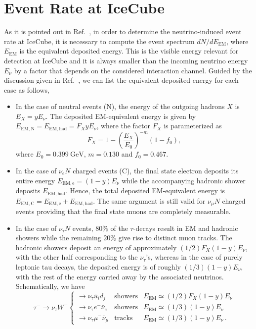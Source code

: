 \documentclass[aps,preprint,tightenlines,floatfix,superscriptaddress,nofootinbib,showpacs]{revtex4-1}
\def\beq{\begin{equation}}
\def\eeq{\end{equation}}
\begin{document}
\section{Event Rate at IceCube}
As it is pointed out in Ref.~\cite{Soni}, in order to determine the neutrino-induced event rate at IceCube, it is necessary to compute the event spectrum $dN/dE_{\mathrm{EM}}$, where $E_{\mathrm{EM}}$ is the equivalent deposited energy. This is the visible energy relevant for detection at IceCube and it is always smaller than the incoming neutrino energy $E_{\nu}$ by a factor that depends on the considered interaction channel. Guided by the discussion given in Ref.~\cite{Soni}, we can list the equivalent deposited energy for each case as follows,
\begin{itemize}
\item In the case of neutral events (N), the energy of the outgoing hadrons $X$ is $E_X=y E_{\nu}$. The deposited EM-equivalent energy is given by $E_{\mathrm{EM, N}}=E_{\mathrm{EM, had}}=F_X y E_{\nu}$, where the factor $F_X$ is parameterized as
\beq
\label{eq138}
F_X=1-\left(\frac{E_X}{E_0}\right)^{-m}(1-f_0),
\eeq
where $E_0=0.399~\mathrm{GeV}$, $m=0.130$ and $f_0=0.467$.
\item In the case of $\nu_e N$ charged events (C), the final state electron deposits its entire energy $E_{\mathrm{EM,e}}=(1-y)E_{\nu}$ while the accompanying hadronic shower deposits $E_{\mathrm{EM, had}}$. Hence, the total deposited EM-equivalent energy is $E_{\mathrm{EM,C}}=E_{\mathrm{EM,e}}+E_{\mathrm{EM, had}}$. The same argument is still valid for $\nu_{\mu} N$ charged events providing that the final state muons are completely measurable. 
\item In the case of $\nu_{\tau}N$ events, $80\%$ of the $\tau$-decays result in EM and hadronic showers while the remaining $20\%$ give rise to distinct muon tracks. The hadronic showers deposit an energy of approximately $(1/2)F_X(1-y)E_{\nu}$, with the other half corresponding to the $\nu_{\tau}$'s, whereas in the case of purely leptonic tau decays, the deposited energy is of roughly $(1/3)(1-y)E_{\nu}$, with the rest of the energy carried away by the associated neutrinos. Schematically, we have
$$\tau^- \to \nu_{\tau}W^- \left\{ \begin{matrix}
\to \nu_{\tau}\bar{u}_id_j & \mbox{showers} & E_{\mathrm{EM}}\simeq(1/2)F_X(1-y)E_{\nu}\\
\to\nu_{\tau} e^-\bar{\nu}_{e} & \mbox{showers} & E_{\mathrm{EM}}\simeq(1/3)(1-y)E_{\nu}\\
\to \nu_{\tau} \mu^- \bar{\nu}_{\mu} & \mbox{tracks} & E_{\mathrm{EM}}\simeq(1/3)(1-y)E_{\nu}\,.
\end{matrix} \right .$$
\end{itemize}  
\end{document}
